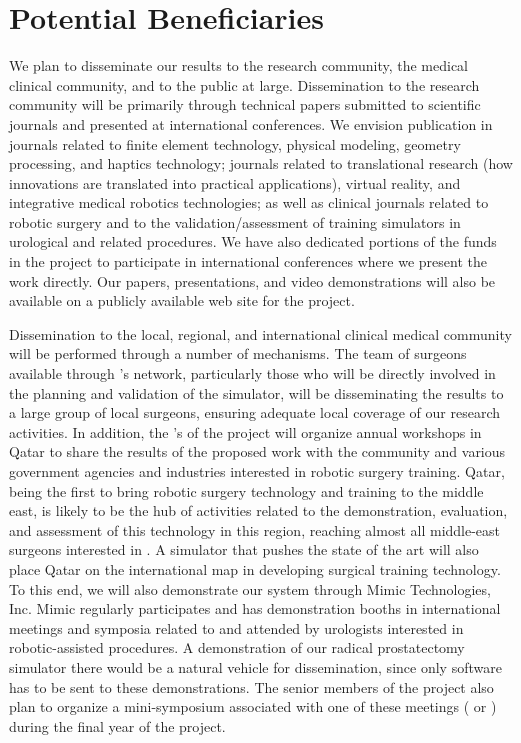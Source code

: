 
\chapter{Potential Beneficiaries}\label{chp:beneficiaries}
We plan to disseminate our results to the research community, the medical clinical community, and to the public at large. Dissemination to the research community will be primarily through technical papers submitted to scientific journals and presented at international conferences. We envision publication in journals related to finite element technology, physical modeling, geometry processing, and haptics technology; journals related to translational research (how innovations are translated into practical applications), virtual reality, and integrative medical robotics technologies; as well as clinical journals related to robotic surgery and to the validation/assessment of training simulators in urological and related procedures. We have also dedicated portions of the funds in the project to participate in international conferences where we present the work directly. Our papers, presentations, and video demonstrations will also be available on a publicly available web site for the project.%

Dissemination to the local, regional, and international clinical medical community will be performed through a number of mechanisms. The team of surgeons available through 's network, particularly those who will be directly involved in the planning and validation of the simulator, will be disseminating the results to a large group of local surgeons, ensuring adequate local coverage of our research activities. In addition, the 's of the project will organize annual workshops in Qatar to share the results of the proposed work with the community and various government agencies and industries interested in robotic surgery training. Qatar, being the first to bring robotic surgery technology and training to the middle east, is likely to be the hub of activities related to the demonstration, evaluation, and assessment of this technology in this region, reaching almost all middle-east surgeons interested in . A simulator that pushes the state of the art will also place Qatar on the international map in developing surgical training technology. To this end, we will also demonstrate our system through Mimic Technologies, Inc. Mimic regularly participates and has demonstration booths in international meetings and symposia related to  and attended by urologists interested in robotic-assisted procedures. A demonstration of our radical prostatectomy simulator there would be a natural vehicle for dissemination, since only software has to be sent to these demonstrations. The senior members of the project also plan to organize a mini-symposium associated with one of these meetings ( or ) during the final year of the project.

